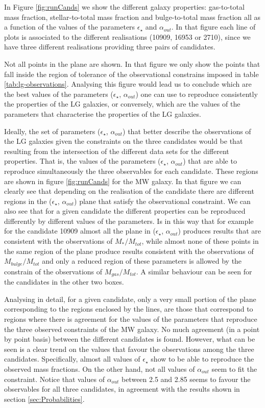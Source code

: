 \documentclass[useAMS,usenatbib]{mn2e}
\begin{document}
In Figure \ref{fig:runCands} we show the different galaxy properties:
gas-to-total mass fraction, stellar-to-total mass fraction and
bulge-to-total mass fraction all as a function of the values of the
parameters $\epsilon_{\star}$ and $\alpha_{out}$. In that figure each
line of plots is associated to the different realisations (10909,
16953 or 2710), since we have three different realisations providing
three pairs of candidates.

Not all points in the plane are shown. In that figure we only show the
points that fall inside the region of tolerance of the observational
constrains imposed in table \ref{tab:lg-observations}. Analysing this
figure would lead us to conclude which are the best values of the
parameters ($\epsilon_{\star}$, $\alpha_{out}$) one can use to
reproduce consistently the properties of the LG galaxies, or
conversely, which are the values of the parameters that characterise
the properties of the LG galaxies.

Ideally, the set of parameters ($\epsilon_{\star}$, $\alpha_{out}$)
that better describe the observations of the LG galaxies given the
constraints on the three candidates would be that resulting from the
intersection of the different data sets for the different
properties. That is, the values of the parameters ($\epsilon_{\star}$,
$\alpha_{out}$) that are able to reproduce simultaneously the three
observables for each candidate. These regions are shown in figure
\ref{fig:runCands} for the MW galaxy. In that figure we can clearly
see that depending on the realisation of the candidate there are
different regions in the ($\epsilon_{\star}$, $\alpha_{out}$) plane
that satisfy the observational constraint. We can also see that for a
given candidate the different properties can be reproduced differently
by different values of the parameters. Is in this way that for example
for the candidate 10909 almost all the plane in ($\epsilon_{\star}$,
$\alpha_{out}$) produces results that are consistent with the
observations of $M_*/M_{tot}$, while almost none of these points in
the same region of the plane produce results consistent with the
observations of $M_{bulge}/M_{tot}$ and only a reduced region of these
parameters is allowed by the constrain of the observations of
$M_{gas}/M_{tot}$. A similar behaviour can be seen for the candidates
in the other two boxes.

Analysing in detail, for a given candidate, only a very small portion
of the plane corresponding to the regions enclosed by the lines, are
those that correspond to regions where there is agreement for the
values of the parameters that reproduce the three observed constraints
of the MW galaxy. No much agreement (in a point by point basis)
between the different candidates is found.  However, what can be seen
is a clear trend on the values that favour the observations among the
three candidates. Specifically, almost all values of
$\epsilon_{\star}$ show to be able to reproduce the observed mass
fractions. On the other hand, not all values of $\alpha_{out}$ seem to
fit the constraint. Notice that values of $\alpha_{out}$ between 2.5
and 2.85 seems to favour the observables for all three candidates, in
agreement with the results shown in section \ref{sec:Probabilities}.
\end{document}
